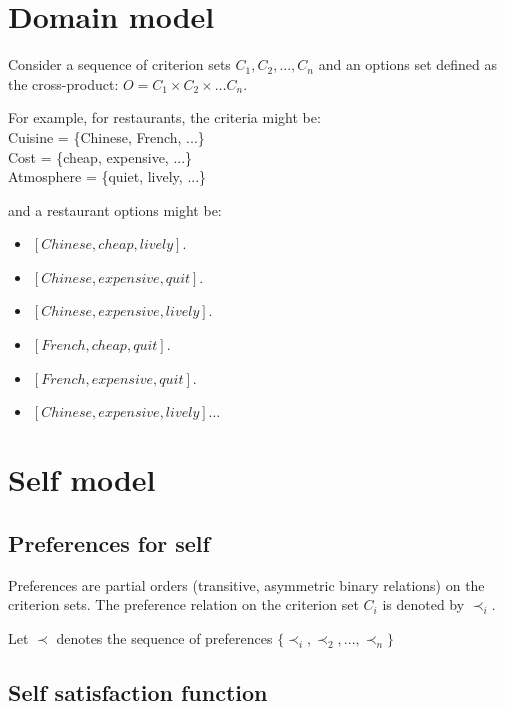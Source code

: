 \documentclass{article}
\begin{document}
		\title{\vskip -10pt}
		
		\author{Lydia Ould Ouali, Charles Rich \and
		Nicolas Sabouret }
		
	
	\section{Domain model}
		Consider a sequence of criterion sets $C_1, C_2, ..., C_n$ and an options set defined as the cross-product:
				$O = C_1 \times C_2 \times \ldots C_n$.
		
		For example, for restaurants, the criteria might be: \\
			Cuisine = \{Chinese, French, ...\} \\
			Cost = \{cheap, expensive, ...\} \\
			Atmosphere = \{quiet, lively, ...\} \\
		
	\par and a restaurant options might be: 
		\begin{itemize}
			 \item $[Chinese, cheap, lively]$. 
			 \item $[Chinese, expensive, quit]$.   
			 \item $[Chinese, expensive, lively]$.
			 \item $[French, cheap, quit]$.  
			 \item $[French, expensive, quit]$.   
			 \item $[Chinese, expensive, lively]\ldots$ 
		\end{itemize}
  
  
	\section{Self model} 
	
	\subsection{Preferences for self}
	Preferences are partial orders (transitive, asymmetric binary relations) on the criterion sets. The preference relation on the criterion set $C_i$ is denoted by $\prec_i$.
	
	Let $\prec$ denotes the sequence of preferences $\{ \prec_i, \prec_2, ..., \prec_n\}$
	
	\subsection{Self satisfaction function} 
	
\end{document}
